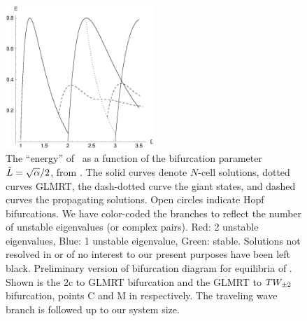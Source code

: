 \begin{figure}[t]
\centering
\includegraphics[width=0.5\textwidth]{figs/ksBifDiag.eps}
\caption{
    {\small
The ``energy'' of \eqva\ as a function of the bifurcation
parameter $\tilde{L}=\sqrt{\alpha}/2$, from .
The solid curves denote $N$-cell solutions,
dotted curves GLMRT, the dash-dotted curve the
giant states, and dashed curves the propagating solutions.
Open circles indicate Hopf bifurcations. 
We have color-coded the branches to reflect the number of unstable
eigenvalues (or complex pairs). Red: 2 unstable eigenvalues, Blue: 1
unstable eigenvalue, Green: stable. Solutions not 
resolved in  or of no interest
to our present purposes have been left black.
    Preliminary version of bifurcation diagram for equilibria of \KSe.  Shown is the 2c to GLMRT bifurcation and the GLMRT to $TW_{\pm2}$ bifurcation, points C and M in  respectively. The traveling wave branch is followed up to our system size.} %
        }
\label{fig:ksBifDiag}
\end{figure}

